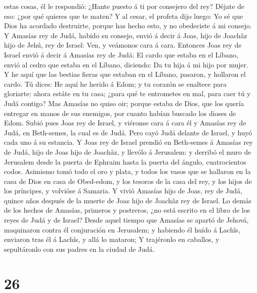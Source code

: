 estas cosas, él le respondió: ¿Hante puesto á ti por consejero del rey?
Déjate de eso: ¿por qué quieres que te maten? Y al cesar, el profeta
dijo luego: Yo sé que Dios ha acordado destruirte, porque has hecho
esto, y no obedeciste á mi consejo.  Y Amasías rey de Judá,
habido su consejo, envió á decir á Joas, hijo de Joachâz hijo de Jehú,
rey de Israel: Ven, y veámonos cara á cara.  Entonces Joas
rey de Israel envió á decir á Amasías rey de Judá: El cardo que estaba
en el Líbano, envió al cedro que estaba en el Líbano, diciendo: Da tu
hija á mi hijo por mujer. Y he aquí que las bestias fieras que estaban
en el Líbano, pasaron, y hollaron el cardo.  Tú dices: He
aquí he herido á Edom; y tu corazón se enaltece para gloriarte: ahora
estáte en tu casa; ¿para qué te entrometes en mal, para caer tú y Judá
contigo?  Mas Amasías no quiso oir; porque estaba de Dios,
que los quería entregar en manos de sus enemigos, por cuanto habían
buscado los dioses de Edom.  Subió pues Joas rey de Israel,
y viéronse cara á cara él y Amasías rey de Judá, en Beth-semes, la cual
es de Judá.  Pero cayó Judá delante de Israel, y huyó cada
uno á su estancia.  Y Joas rey de Israel prendió en
Beth-semes á Amasías rey de Judá, hijo de Joas hijo de Joachâz, y
llevólo á Jerusalem: y derribó el muro de Jerusalem desde la puerta de
Ephraim hasta la puerta del ángulo, cuatrocientos codos. 
Asimismo tomó todo el oro y plata, y todos los vasos que se hallaron en
la casa de Dios en casa de Obed-edom, y los tesoros de la casa del rey,
y los hijos de los príncipes, y volvióse á Samaria.  Y
vivió Amasías hijo de Joas, rey de Judá, quince años después de la
muerte de Joas hijo de Joachâz rey de Israel.  Lo demás de
los hechos de Amasías, primeros y postreros, ¿no está escrito en el
libro de los reyes de Judá y de Israel?  Desde aquel tiempo
que Amasías se apartó de Jehová, maquinaron contra él conjuración en
Jerusalem; y habiendo él huído á Lachîs, enviaron tras él á Lachîs, y
allá lo mataron;  Y trajéronlo en caballos, y sepultáronlo
con sus padres en la ciudad de Judá.

\hypertarget{section-25}{%
\section{26}\label{section-25}}

